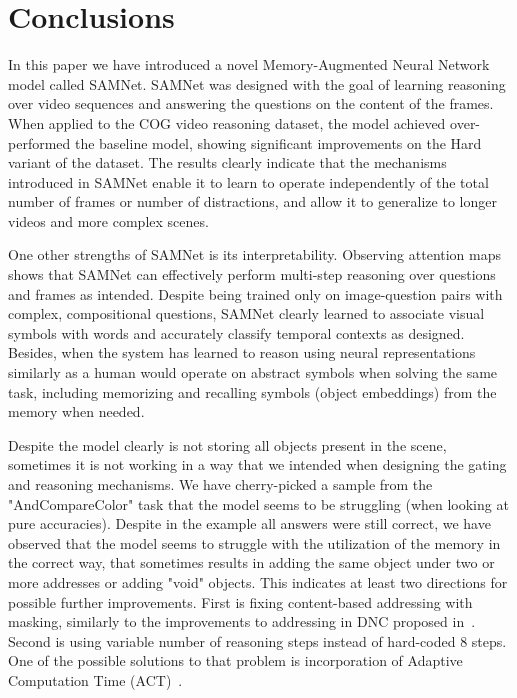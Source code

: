\section{Conclusions}

In this paper we have introduced a novel Memory-Augmented Neural Network model called SAMNet.
SAMNet was designed with the goal of learning reasoning over video sequences and answering the questions on the content of the frames.
When applied to the COG video reasoning dataset, the model achieved over-performed the baseline model, showing significant improvements on the Hard variant of the dataset.
The results clearly indicate that the mechanisms introduced in SAMNet  enable it to learn to operate independently of the total number of frames or number of distractions, and allow it to generalize to longer videos and more complex scenes. 

One other strengths of SAMNet is its interpretability.
Observing attention maps shows that SAMNet can effectively perform multi-step reasoning over questions and frames as intended. 
Despite being trained only on image-question pairs with complex, compositional questions, SAMNet clearly learned to associate visual symbols with words and accurately classify temporal contexts as designed.
Besides, when the system has learned to reason using neural representations similarly as a human would operate on abstract symbols when solving the same task, including memorizing and recalling symbols (object embeddings) from the memory when needed.

Despite the model clearly is not storing all objects present in the scene, sometimes it is not working in a way that we intended when designing the gating and reasoning mechanisms.
We have cherry-picked a sample from the "AndCompareColor" task that the model seems to be struggling (when looking at pure accuracies).
Despite in the example all answers were still correct, we have observed that the model seems to struggle with the utilization of the memory in the correct way, that sometimes results in adding the same object under two or more addresses or adding "void" objects.
This indicates at least two directions for possible further improvements.
First is fixing content-based addressing with masking, similarly to the improvements to addressing in DNC proposed in~\cite{csordas2019improved}.
Second is using variable number of reasoning steps instead of hard-coded 8 steps.
One of the possible solutions to that problem is incorporation of Adaptive Computation Time (ACT)~\cite{graves2016adaptive}.




